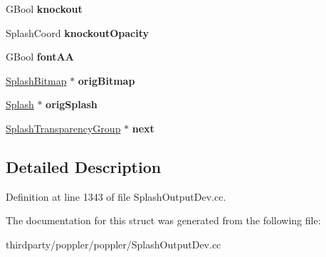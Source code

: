 \begin{DoxyCompactItemize}
G\+Bool {\bfseries knockout}
\item 
\mbox{\label{struct_splash_transparency_group_ac1d8a7638ee4a2c8f72a2b68dbfc5bf7}} 
Splash\+Coord {\bfseries knockout\+Opacity}
\item 
\mbox{\label{struct_splash_transparency_group_a1b378d365735f1ef4719eb5feff57c94}} 
G\+Bool {\bfseries font\+AA}
\item 
\mbox{\label{struct_splash_transparency_group_a4a77af9d7b8ba2b8ee1adcef4bdc218f}} 
\hyperlink{class_splash_bitmap}{Splash\+Bitmap} $\ast$ {\bfseries orig\+Bitmap}
\item 
\mbox{\label{struct_splash_transparency_group_a1f5575f6006c82b2698ad762eb34cc01}} 
\hyperlink{class_splash}{Splash} $\ast$ {\bfseries orig\+Splash}
\item 
\mbox{\label{struct_splash_transparency_group_af7f7c08e69624d72aeb0d904bb4bbf58}} 
\hyperlink{struct_splash_transparency_group}{Splash\+Transparency\+Group} $\ast$ {\bfseries next}
\end{DoxyCompactItemize}


\subsection{Detailed Description}


Definition at line 1343 of file Splash\+Output\+Dev.\+cc.



The documentation for this struct was generated from the following file\+:\begin{DoxyCompactItemize}
\item 
thirdparty/poppler/poppler/Splash\+Output\+Dev.\+cc\end{DoxyCompactItemize}
